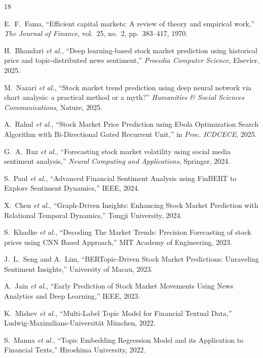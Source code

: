 \documentclass[11pt]{article}
\begin{document}

\begin{thebibliography}{18}

E.~F.~Fama, ``Efficient capital markets: A review of theory and empirical work,'' \textit{The Journal of Finance}, vol.~25, no.~2, pp.~383--417, 1970.

H.~Bhandari \textit{et al.}, ``Deep learning-based stock market prediction using historical price and topic-distributed news sentiment,'' \textit{Procedia Computer Science}, Elsevier, 2025.

M.~Nazari \textit{et al.}, ``Stock market trend prediction using deep neural network via chart analysis: a practical method or a myth?'' \textit{Humanities \& Social Sciences Communications}, Nature, 2025.

A.~Rahul \textit{et al.}, ``Stock Market Price Prediction using Ebola Optimization Search Algorithm with Bi-Directional Gated Recurrent Unit,'' in \textit{Proc. ICDCECE}, 2025.

G.~A.~Ruz \textit{et al.}, ``Forecasting stock market volatility using social media sentiment analysis,'' \textit{Neural Computing and Applications}, Springer, 2024.

S.~Paul \textit{et al.}, ``Advanced Financial Sentiment Analysis using FinBERT to Explore Sentiment Dynamics,'' IEEE, 2024.

X.~Chen \textit{et al.}, ``Graph-Driven Insights: Enhancing Stock Market Prediction with Relational Temporal Dynamics,'' Tongji University, 2024.

S.~Khadke \textit{et al.}, ``Decoding The Market Trends: Precision Forecasting of stock prices using CNN Based Approach,'' MIT Academy of Engineering, 2023.

J.~L.~Seng and A.~Lim, ``BERTopic-Driven Stock Market Predictions: Unraveling Sentiment Insights,'' University of Macau, 2023.

A.~Jain \textit{et al.}, ``Early Prediction of Stock Market Movements Using News Analytics and Deep Learning,'' IEEE, 2023.

K.~Mishev \textit{et al.}, ``Multi-Label Topic Model for Financial Textual Data,'' Ludwig-Maximilians-Universit\"{a}t M\"{u}nchen, 2022.

S.~Manna \textit{et al.}, ``Topic Embedding Regression Model and its Application to Financial Texts,'' Hiroshima University, 2022.


\end{thebibliography}
\end{document}
